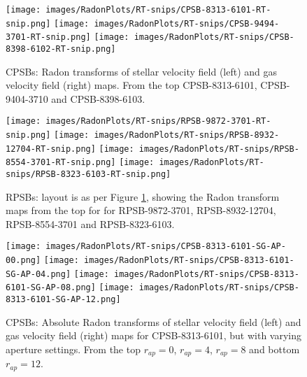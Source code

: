 
\begin{figure}
    \centering
    \texttt{[image: images/RadonPlots/RT-snips/CPSB-8313-6101-RT-snip.png]}
    \texttt{[image: images/RadonPlots/RT-snips/CPSB-9494-3701-RT-snip.png]}
    \texttt{[image: images/RadonPlots/RT-snips/CPSB-8398-6102-RT-snip.png]}
    \caption{CPSBs: Radon transforms of stellar velocity field (left) and gas velocity field (right) maps. From the top CPSB-8313-6101, CPSB-9404-3710 and CPSB-8398-6103.}
    \label{fig:CPSB-RTs}
\end{figure}

\begin{figure}
    \centering
    \texttt{[image: images/RadonPlots/RT-snips/RPSB-9872-3701-RT-snip.png]}
    \texttt{[image: images/RadonPlots/RT-snips/RPSB-8932-12704-RT-snip.png]}
    \texttt{[image: images/RadonPlots/RT-snips/RPSB-8554-3701-RT-snip.png]}
    \texttt{[image: images/RadonPlots/RT-snips/RPSB-8323-6103-RT-snip.png]}
    \caption{RPSBs: layout is as per Figure \ref{fig:CPSB-RTs}, showing the Radon transform maps from the top for for RPSB-9872-3701, RPSB-8932-12704, RPSB-8554-3701 and RPSB-8323-6103.}
    \label{fig:RPSB-RTs}
\end{figure}

\begin{figure}
    \centering
    \texttt{[image: images/RadonPlots/RT-snips/CPSB-8313-6101-SG-AP-00.png]}
    \texttt{[image: images/RadonPlots/RT-snips/CPSB-8313-6101-SG-AP-04.png]}
    \texttt{[image: images/RadonPlots/RT-snips/CPSB-8313-6101-SG-AP-08.png]}
    \texttt{[image: images/RadonPlots/RT-snips/CPSB-8313-6101-SG-AP-12.png]}
    \caption{CPSBs: Absolute Radon transforms of stellar velocity field (left) and gas velocity field (right) maps for CPSB-8313-6101, but with varying aperture settings. From the top $r_{ap}=0$, $r_{ap}=4$, $r_{ap}=8$ and bottom $r_{ap}=12$.}
    \label{fig:CPSB-RT-Apertures}
\end{figure}

